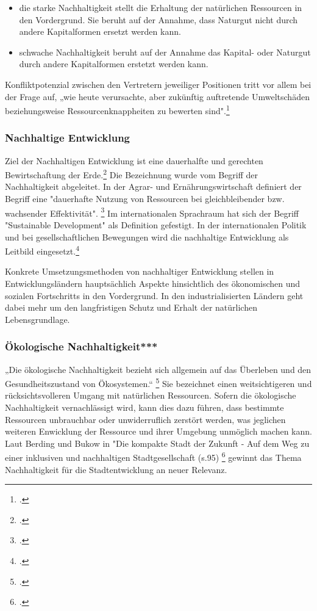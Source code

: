 \documentclass{scrartcl}
\begin{document}
\begin{itemize}
\item die starke Nachhaltigkeit stellt die Erhaltung der natürlichen Ressourcen in den Vordergrund. Sie beruht auf der Annahme, dass Naturgut nicht durch andere Kapitalformen ersetzt werden kann.
\item schwache Nachhaltigkeit beruht auf der Annahme das Kapital- oder Naturgut durch andere Kapitalformen erstetzt werden kann.
\end{itemize}
Konfliktpotenzial zwischen den Vertretern jeweiliger Positionen tritt vor allem bei der Frage auf, „wie heute verursachte, aber zukünftig auftretende Umweltschäden beziehungsweise Ressourcenknappheiten zu bewerten sind".\footcite{NachhaltigeBrockhaus.de}



\subsubsection{Nachhaltige Entwicklung}
  Ziel der Nachhaltigen Entwicklung ist eine dauerhalfte und gerechten Bewirtschaftung der Erde.\footcite{NachhaltigeBrockhaus.de} Die Bezeichnung wurde vom Begriff der Nachhaltigkeit abgeleitet. In der Agrar- und Ernährungswirtschaft definiert der Begriff eine "dauerhafte Nutzung von Ressourcen bei gleichbleibender bzw. wachsender Effektivität". \footcite{oppenhauser2010nachhaltigkeit} Im internationalen Sprachraum hat sich der Begriff "Sustainable Development" als Definition gefestigt. In der internationalen Politik und bei gesellschaftlichen Bewegungen wird die nachhaltige Entwicklung als Leitbild eingesetzt.\footcite{oppenhauser2010nachhaltigkeit}
 
 Konkrete Umsetzungsmethoden von nachhaltiger Entwicklung stellen in Entwicklungsländern hauptsächlich Aspekte hinsichtlich des ökonomischen und sozialen Fortschritts in den Vordergrund. In den industrialisierten Ländern geht dabei mehr um den langfristigen Schutz und Erhalt der natürlichen Lebensgrundlage. 



\subsubsection{Ökologische Nachhaltigkeit***}
„Die ökologische Nachhaltigkeit bezieht sich allgemein auf das Überleben und den Gesundheitszustand von Ökosystemen.“ \footcite{DefinitionWirtschaftslexikonc}  Sie bezeichnet einen weitsichtigeren und rücksichtsvolleren Umgang mit natürlichen Ressourcen. Sofern die ökologische Nachhaltigkeit vernachlässigt wird, kann dies dazu führen, dass bestimmte Ressourcen unbrauchbar oder unwiderruflich zerstört werden, was jeglichen weiteren Enwicklung der Ressource und ihrer Umgebung unmöglich machen kann. Laut Berding und Bukow in "Die kompakte Stadt der Zukunft - Auf dem Weg zu einer inklusiven und nachhaltigen Stadtgesellschaft (s.95) \footcite{BerdingWolf-DietrichBukowKarinCudakHrsgDieStadtgesellschaft} gewinnt das Thema Nachhaltigkeit für die Stadtentwicklung an neuer Relevanz. 
\end{document}
